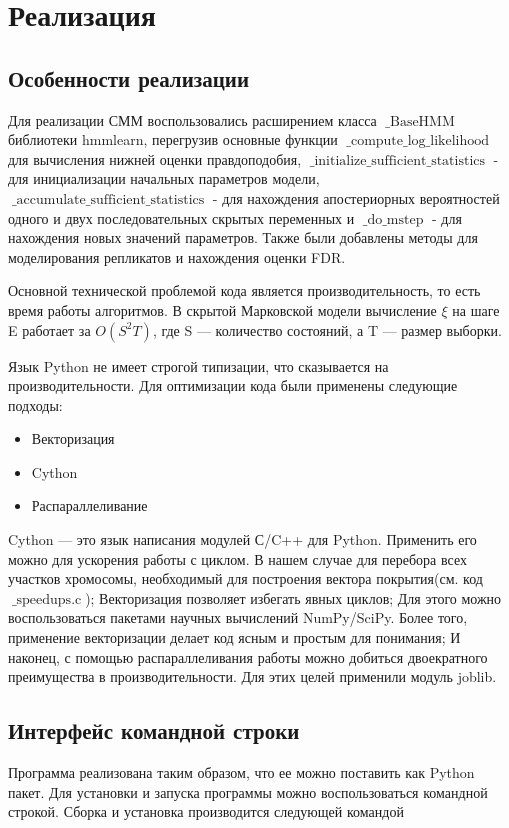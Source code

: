 \documentclass{matmex-diploma-custom}
\begin{document}
\section{Реализация}
\subsection{Особенности реализации}
Для реализации СММ воспользовались расширением класса $\operatorname{\_BaseHMM}$ библиотеки hmmlearn, перегрузив основные функции $\operatorname{\_compute\_log\_likelihood}$ для вычисления нижней оценки правдоподобия, $\operatorname{\_initialize\_sufficient\_statistics}$ - для инициализации начальных параметров модели, $\operatorname{\_accumulate\_sufficient\_statistics}$ - для нахождения апостериорных вероятностей одного и двух последовательных скрытых переменных и $\operatorname{\_do\_mstep}$ - для нахождения новых значений параметров. Также были добавлены методы для моделирования репликатов и нахождения оценки FDR.

Основной технической проблемой кода является производительность, то есть время работы алгоритмов. В скрытой Марковской модели вычисление $\xi$ на шаге E работает за $O(S^2 T)$, где S — количество состояний, а T — размер выборки.

Язык Python не имеет строгой типизации, что сказывается на производительности.
Для оптимизации кода были применены следующие подходы:

\begin{itemize}
  \item Векторизация
  \item Cython
  \item Распараллеливание
\end{itemize}

Cython --- это язык написания модулей С/C++ для Python. Применить его можно для ускорения работы с циклом. В нашем случае для перебора всех участков хромосомы, необходимый для построения вектора покрытия(см. код $\operatorname{\_speedups.c}$); Векторизация позволяет избегать явных циклов; Для этого можно воспользоваться пакетами научных вычислений NumPy/SciPy. Более того, применение векторизации делает код ясным и простым для понимания; И наконец, с помощью распараллеливания работы можно добиться двоекратного преимущества в производительности. Для этих целей применили модуль joblib.

\subsection{Интерфейс командной строки}
Программа реализована таким образом, что ее можно поставить как Python пакет.
Для установки и запуска программы можно воспользоваться командной строкой.
Сборка и установка производится следующей командой
\end{document}
